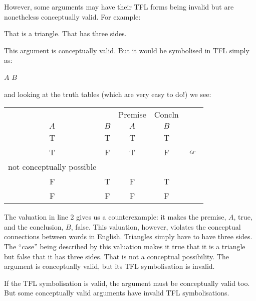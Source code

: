 However, some arguments may have their TFL forms being invalid but are nonetheless conceptually valid. For example:
\begin{earg}
	\prem That is a triangle.
	\conc That has three sides.
\end{earg}
This argument is conceptually valid. But it would be symbolised in TFL simply as:
\begin{earg}
\prem $A$
\conc $B$
\end{earg}and looking at the truth tables (which are very easy to do!) we see:
\begin{center}
\begin{tabular}{cc|ccl}
&&Premise&Concln\\
$A$&$B$&$A$&$B$\\\cline{1-4}
T&T&T&T\\
T&F&T&F&$\leftsquigarrow$ \begin{minipage}{.4\linewidth}
 counterexample valuation, \\not conceptually possible
\end{minipage}\\
F&T&F&T\\
F&F&F&F
\end{tabular}
\end{center}
The valuation in line 2 gives us a counterexample: it makes the premise, $A$, true, and the conclusion, $B$, false.
This valuation, however, violates the conceptual connections between words in English. Triangles simply have to have three sides. The ``case'' being described by this valuation makes it true that it is a triangle but false that it has three sides. That is not a conceptual possibility.
The argument is conceptually valid, but its TFL symbolisation is invalid.

If the TFL symbolisation is valid, the argument must be conceptually valid too. But some conceptually valid arguments have invalid TFL symbolisations.

